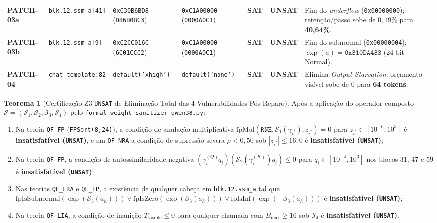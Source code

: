 \documentclass[11pt,a4paper]{article}
\theoremstyle{definition}
\newtheorem{theorem}{Teorema}
\begin{document}
\begin{table}[H]
\begin{tabularx}{\textwidth}{l l l l c c X}
\midrule
\textbf{PATCH-03a} & \texttt{blk.12.ssm\_a[41]} & \texttt{0xC30B6BD8} (\texttt{D86B0BC3}) & \texttt{0xC1A00000} (\texttt{0000A0C1}) & \textcolor{flawred}{\textbf{SAT}} & \textcolor{safegreen}{\textbf{UNSAT}} & Fim do \textit{underflow} (\texttt{0x00000000}); retenção/passo sobe de $0{,}19\%$ para \textbf{40,64\%}. \\
\textbf{PATCH-03b} & \texttt{blk.12.ssm\_a[9]} & \texttt{0xC2CC016C} (\texttt{6C01CCC2}) & \texttt{0xC1A00000} (\texttt{0000A0C1}) & \textcolor{flawred}{\textbf{SAT}} & \textcolor{safegreen}{\textbf{UNSAT}} & Fim do subnormal (\texttt{0x00000004}); $\exp(a)=\texttt{0x310DA433}$ (24-bit Normal). \\
\midrule
\textbf{PATCH-04} & \texttt{chat\_template:82} & \texttt{default('xhigh')} & \texttt{default('none')} & \textcolor{flawred}{\textbf{SAT}} & \textcolor{safegreen}{\textbf{UNSAT}} & Elimina \textit{Output Starvation}: orçamento visível sobe de $0$ para \textbf{64 tokens}. \\
\bottomrule
\end{tabularx}
\end{table}

\begin{theorem}[Certificação Z3 \texttt{UNSAT} de Eliminação Total das 4 Vulnerabilidades Pós-Reparo]
Após a aplicação do operador composto $\mathcal{S} = (\mathcal{S}_1, \mathcal{S}_2, \mathcal{S}_3, \mathcal{S}_4)$ pelo \texttt{formal\_weight\_sanitizer\_qwen38.py}:
\begin{enumerate}
    \item Na teoria \texttt{QF\_FP} (\texttt{FPSort(8,24)}), a condição de anulação multiplicativa $\text{fpMul}(\texttt{RNE}, \mathcal{S}_1(\gamma_{i^*}), z_{i^*}) = 0$ para $z_{i^*} \in [10^{-6}, 10^3]$ é \textbf{insatisfatível (\texttt{UNSAT})}, e em \texttt{QF\_NRA} a condição de supressão severa $\rho < 0{,}50$ sob $|z_{i^*}| \le 16{,}0$ é \textbf{insatisfatível (\texttt{UNSAT})};
    \item Na teoria \texttt{QF\_FP}, a condição de autossimilaridade negativa $(\gamma_i^{(Q)} q_i)(\mathcal{S}_2(\gamma_i^{(K)}) q_i) \le 0$ para $q_i \in [10^{-4}, 10^3]$ nos blocos 31, 47 e 59 é \textbf{insatisfatível (\texttt{UNSAT})};
    \item Nas teorias \texttt{QF\_LRA} e \texttt{QF\_FP}, a existência de qualquer cabeça em \texttt{blk.12.ssm\_a} tal que $\text{fpIsSubnormal}(\exp(\mathcal{S}_3(a_h))) \lor \text{fpIsZero}(\exp(\mathcal{S}_3(a_h))) \lor \text{fpIsInf}(\exp(-\mathcal{S}_3(a_h)))$ é \textbf{insatisfatível (\texttt{UNSAT})};
    \item Na teoria \texttt{QF\_LIA}, a condição de inanição $T_{\text{visible}} \le 0$ para qualquer chamada com $B_{\max} \ge 16$ sob $\mathcal{S}_4$ é \textbf{insatisfatível (\texttt{UNSAT})}.
\end{enumerate}
\end{theorem}
\end{document}
